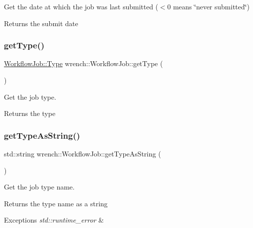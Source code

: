 Get the date at which the job was last submitted ($<$0 means \char`\"{}never submitted\char`\"{}) 

\begin{DoxyReturn}{Returns}
the submit date 
\end{DoxyReturn}
\mbox{\label{classwrench_1_1_workflow_job_a1883671a4e72877bb7fcb0ce771fdc7e}} 
\subsubsection{\texorpdfstring{get\+Type()}{getType()}}
{\footnotesize\ttfamily \hyperlink{classwrench_1_1_workflow_job_a5dcf81c50b5d221ef2a48126bf45d08b}{Workflow\+Job\+::\+Type} wrench\+::\+Workflow\+Job\+::get\+Type (\begin{DoxyParamCaption}{ }\end{DoxyParamCaption})}



Get the job type. 

\begin{DoxyReturn}{Returns}
the type 
\end{DoxyReturn}
\mbox{\label{classwrench_1_1_workflow_job_a8162ab7d79c56373d610f8cb7b3f1f07}} 
\subsubsection{\texorpdfstring{get\+Type\+As\+String()}{getTypeAsString()}}
{\footnotesize\ttfamily std\+::string wrench\+::\+Workflow\+Job\+::get\+Type\+As\+String (\begin{DoxyParamCaption}{ }\end{DoxyParamCaption})}



Get the job type name. 

\begin{DoxyReturn}{Returns}
the type name as a string
\end{DoxyReturn}

\begin{DoxyExceptions}{Exceptions}
{\em std\+::runtime\+\_\+error} & \\
\hline
\end{DoxyExceptions}
\mbox{\label{classwrench_1_1_workflow_job_a70b0cde49a330b62a7e77382e6eddbe1}} 
